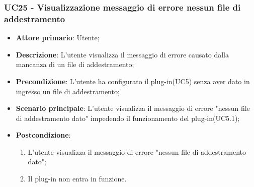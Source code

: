 \subsubsection{UC25 - Visualizzazione messaggio di errore nessun file di addestramento}
\label{sssec:uc25}
\begin{itemize}
  \item \textbf{Attore primario}: Utente;
  \item \textbf{Descrizione}: L'utente visualizza il messaggio di errore causato dalla mancanza di un file di addestramento;
  \item \textbf{Precondizione}: L'utente ha configurato il plug-in(UC5) senza aver dato in ingresso un file di addestramento;
  \item \textbf{Scenario principale}: L'utente visualizza il messaggio di errore "nessun file di addestramento dato" impedendo il funzionamento del plug-in(UC5.1);
  \item \textbf{Postcondizione}:
  \begin{enumerate}
		\item L'utente visualizza il messaggio di errore "nessun file di addestramento dato";
		\item Il plug-in non entra in funzione.
	\end{enumerate}
\end{itemize}
